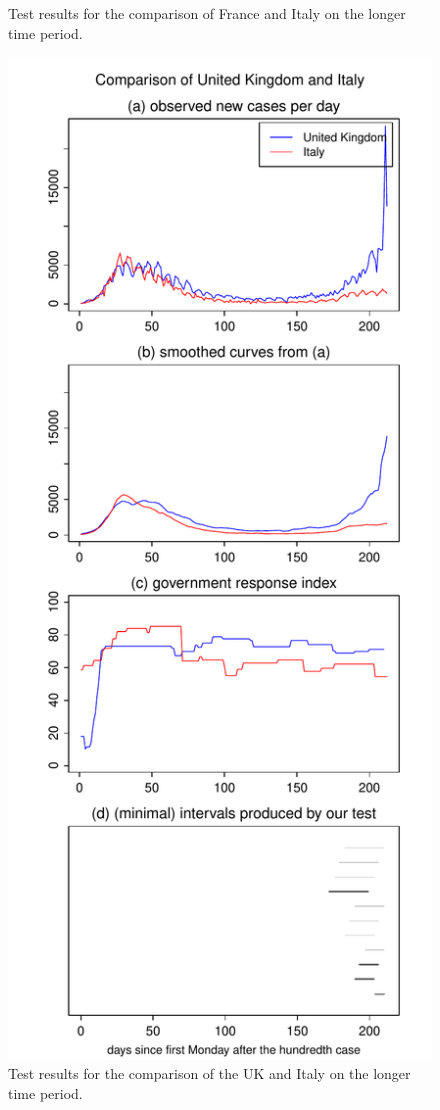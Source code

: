 \documentclass[a4paper,12pt]{article}
\numberwithin{equation}{section}
\begin{document}
\begin{figure}[h!]
\begin{minipage}[t]{0.49\textwidth}
\caption{Test results for the comparison of France and Italy on the longer time period.}
\end{minipage}
\hspace{0.25cm}
\begin{minipage}[t]{0.49\textwidth}
\includegraphics[width=\textwidth]{plots/GBR_vs_ITA_long}
\caption{Test results for the comparison of the UK and Italy on the longer time period.}
\end{minipage}
\end{figure}
\end{document}
